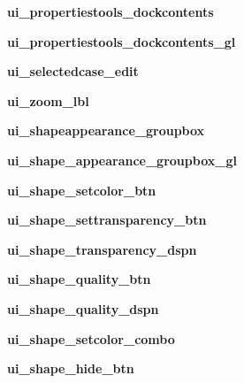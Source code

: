 \begin{DoxyCompactItemize}
\hypertarget{a00105_a26eae51ef2c81417b401501bca6ce10a}{}\label{a00105_a26eae51ef2c81417b401501bca6ce10a} 
{\bfseries ui\+\_\+propertiestools\+\_\+dockcontents}
\item 
\hypertarget{a00105_a83c00b5893231c0eba98a9e8e22ac09c}{}\label{a00105_a83c00b5893231c0eba98a9e8e22ac09c} 
{\bfseries ui\+\_\+propertiestools\+\_\+dockcontents\+\_\+gl}
\item 
\hypertarget{a00105_a0b802c9e05ee17be9d7fd6a867b2aa0f}{}\label{a00105_a0b802c9e05ee17be9d7fd6a867b2aa0f} 
{\bfseries ui\+\_\+selectedcase\+\_\+edit}
\item 
\hypertarget{a00105_ab3983cab5036a720f91ae2ae62374f73}{}\label{a00105_ab3983cab5036a720f91ae2ae62374f73} 
{\bfseries ui\+\_\+zoom\+\_\+lbl}
\item 
\hypertarget{a00105_aa660273332cc5da8d46ae6e465323eda}{}\label{a00105_aa660273332cc5da8d46ae6e465323eda} 
{\bfseries ui\+\_\+shapeappearance\+\_\+groupbox}
\item 
\hypertarget{a00105_a04a31fbb2f456070dfd32b6f122923b6}{}\label{a00105_a04a31fbb2f456070dfd32b6f122923b6} 
{\bfseries ui\+\_\+shape\+\_\+appearance\+\_\+groupbox\+\_\+gl}
\item 
\hypertarget{a00105_a2b9029cd44541c9b09508f9cddbbffd7}{}\label{a00105_a2b9029cd44541c9b09508f9cddbbffd7} 
{\bfseries ui\+\_\+shape\+\_\+setcolor\+\_\+btn}
\item 
\hypertarget{a00105_a29e4e3e1bc1a96b5b5970f03ccdc3258}{}\label{a00105_a29e4e3e1bc1a96b5b5970f03ccdc3258} 
{\bfseries ui\+\_\+shape\+\_\+settransparency\+\_\+btn}
\item 
\hypertarget{a00105_a0ad9bf35073cf45204d5ddca0156df53}{}\label{a00105_a0ad9bf35073cf45204d5ddca0156df53} 
{\bfseries ui\+\_\+shape\+\_\+transparency\+\_\+dspn}
\item 
\hypertarget{a00105_a4ee4bf54cb958bebdc43e8598dcdd459}{}\label{a00105_a4ee4bf54cb958bebdc43e8598dcdd459} 
{\bfseries ui\+\_\+shape\+\_\+quality\+\_\+btn}
\item 
\hypertarget{a00105_a091706f3093b19dadcf896b4fc354dc1}{}\label{a00105_a091706f3093b19dadcf896b4fc354dc1} 
{\bfseries ui\+\_\+shape\+\_\+quality\+\_\+dspn}
\item 
\hypertarget{a00105_a6412380402adf28d010e459b538c97be}{}\label{a00105_a6412380402adf28d010e459b538c97be} 
{\bfseries ui\+\_\+shape\+\_\+setcolor\+\_\+combo}
\item 
\hypertarget{a00105_af27038ec976b97c8007f5914afb2f4ed}{}\label{a00105_af27038ec976b97c8007f5914afb2f4ed} 
{\bfseries ui\+\_\+shape\+\_\+hide\+\_\+btn}

\end{DoxyCompactItemize}
